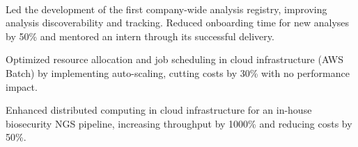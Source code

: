 \documentclass[]{resume}
\begin{document}
\begin{minipage}[t]{0.69\textwidth}

\\
\begin{tightemize}
    \item{Led the development of the first company-wide analysis registry, improving analysis discoverability and tracking. Reduced onboarding time for new analyses by 50\% and mentored an intern through its successful delivery.}
    \item{Optimized resource allocation and job scheduling in cloud infrastructure (AWS Batch) by implementing auto-scaling, cutting costs by 30\% with no performance impact.}
    \item{Enhanced distributed computing in cloud infrastructure for an in-house biosecurity NGS pipeline, increasing throughput by 1000\% and reducing costs by 50\%.}
\end{tightemize}
\sectionsep


\end{minipage}
\end{document}
